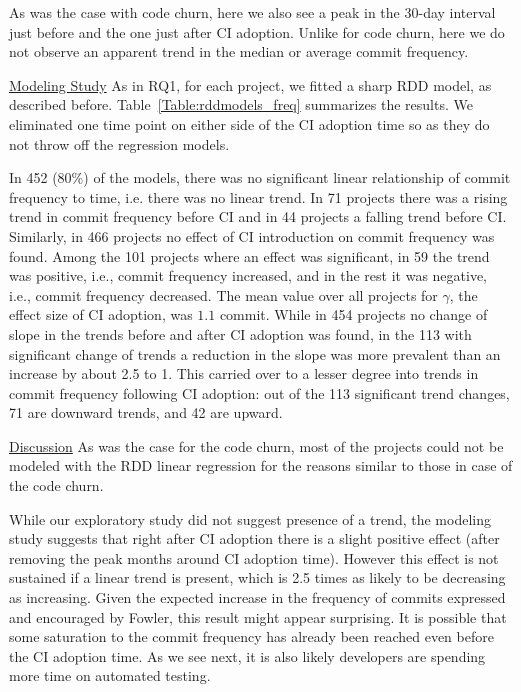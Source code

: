 As was the case with code churn, here we also see a peak in the 30-day interval just before and the one just after CI adoption.
Unlike for code churn, here we do not observe an apparent trend in the median or average commit frequency.

\noindent \underline{Modeling Study} 
As in RQ1, for each project, we fitted a sharp RDD model, as described before.
Table~\ref{Table:rddmodels_freq} summarizes the results.
We eliminated one time point on either side of the CI adoption time so as they do not throw off the regression models.


In 452 (80\%) of the models, there was no significant linear relationship of commit frequency to time, i.e. there was no linear trend.
In 71 projects there was a rising trend in commit frequency before CI and in 44 projects a falling trend before CI.
Similarly, in 466 projects no effect of CI introduction on commit frequency was found. Among the 101 projects where an effect was significant, in 59 the trend was positive, i.e., commit frequency increased, and in the rest it was negative, i.e., commit frequency decreased.
The mean value over all projects for $\gamma$, the effect size of CI adoption, was $1.1$ commit.
While in 454 projects no change of slope in the trends before and after CI adoption was found, in the 113 with significant change of trends a reduction in the slope was more prevalent than an increase by about 2.5 to 1.
This carried over to a lesser degree into trends in commit frequency following CI adoption: out of the 113 significant trend changes, 71 are downward trends, and 42 are upward.

\noindent \underline{Discussion}
As was the case for the code churn, most of the projects could not be modeled with the RDD linear regression for 
the reasons similar to those in case of the code churn.

While our exploratory study did not suggest presence of a trend, the modeling study suggests that right after CI adoption there is a slight positive effect (after removing the peak months around CI adoption time). However this effect is not sustained if a linear 
trend is present, which is 2.5 times as likely to be decreasing as increasing. 
Given the expected increase in the frequency of commits expressed and encouraged by Fowler, this result might appear surprising.
It is possible that some saturation to the commit frequency has already been reached even before the CI adoption time.
As we see next, it is also likely developers are spending more time on automated testing.


